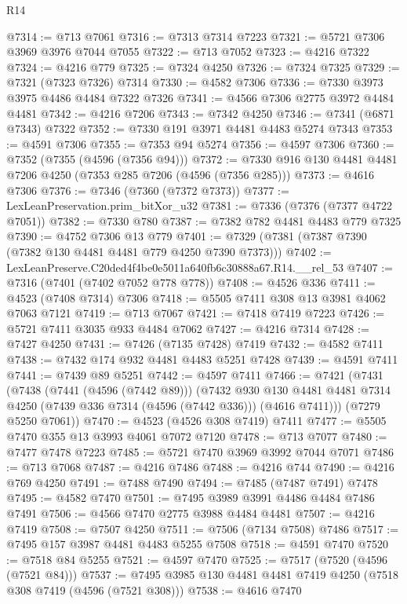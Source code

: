 \begin{lexlean}{R14}
\begin{coremodule}
@7314 := @713 @7061
@7316 := @7313 @7314 @7223
@7321 := @5721 @7306 @3969 @3976 @7044 @7055
@7322 := @713 @7052
@7323 := @4216 @7322
@7324 := @4216 @779
@7325 := @7324 @4250
@7326 := @7324 @7325
@7329 := @7321 (@7323 @7326) @7314
@7330 := @4582 @7306
@7336 := @7330 @3973 @3975 @4486 @4484 @7322 @7326
@7341 := @4566 @7306 @2775 @3972 @4484 @4481
@7342 := @4216 @7206
@7343 := @7342 @4250
@7346 := @7341 (@6871 @7343) @7322
@7352 := @7330 @191 @3971 @4481 @4483 @5274 @7343
@7353 := @4591 @7306
@7355 := @7353 @94 @5274
@7356 := @4597 @7306
@7360 := @7352 (@7355 (@4596 (@7356 @94)))
@7372 := @7330 @916 @130 @4481 @4481 @7206 @4250 (@7353 @285 @7206 (@4596 (@7356 @285)))
@7373 := @4616 @7306
@7376 := @7346 (@7360 (@7372 @7373))
@7377 := LexLeanPreservation.prim_bitXor_u32
@7381 := @7336 (@7376 (@7377 @4722 @7051))
@7382 := @7330 @780
@7387 := @7382 @782 @4481 @4483 @779 @7325
@7390 := @4752 @7306 @13 @779
@7401 := @7329 (@7381 (@7387 @7390 (@7382 @130 @4481 @4481 @779 @4250 @7390 @7373)))
@7402 := LexLeanPreserve.C20ded4f4be0e5011a640fb6c30888a67.R14.__rel_53
@7407 := @7316 (@7401 (@7402 @7052 @778 @778))
@7408 := @4526 @336
@7411 := @4523 (@7408 @7314) @7306
@7418 := @5505 @7411 @308 @13 @3981 @4062 @7063 @7121
@7419 := @713 @7067
@7421 := @7418 @7419 @7223
@7426 := @5721 @7411 @3035 @933 @4484 @7062
@7427 := @4216 @7314
@7428 := @7427 @4250
@7431 := @7426 (@7135 @7428) @7419
@7432 := @4582 @7411
@7438 := @7432 @174 @932 @4481 @4483 @5251 @7428
@7439 := @4591 @7411
@7441 := @7439 @89 @5251
@7442 := @4597 @7411
@7466 := @7421
    (@7431
      (@7438
        (@7441 (@4596 (@7442 @89)))
        (@7432
          @930
          @130
          @4481
          @4481
          @7314
          @4250
          (@7439 @336 @7314 (@4596 (@7442 @336)))
          (@4616 @7411)))
      (@7279 @5250 @7061))
@7470 := @4523 (@4526 @308 @7419) @7411
@7477 := @5505 @7470 @355 @13 @3993 @4061 @7072 @7120
@7478 := @713 @7077
@7480 := @7477 @7478 @7223
@7485 := @5721 @7470 @3969 @3992 @7044 @7071
@7486 := @713 @7068
@7487 := @4216 @7486
@7488 := @4216 @744
@7490 := @4216 @769 @4250
@7491 := @7488 @7490
@7494 := @7485 (@7487 @7491) @7478
@7495 := @4582 @7470
@7501 := @7495 @3989 @3991 @4486 @4484 @7486 @7491
@7506 := @4566 @7470 @2775 @3988 @4484 @4481
@7507 := @4216 @7419
@7508 := @7507 @4250
@7511 := @7506 (@7134 @7508) @7486
@7517 := @7495 @157 @3987 @4481 @4483 @5255 @7508
@7518 := @4591 @7470
@7520 := @7518 @84 @5255
@7521 := @4597 @7470
@7525 := @7517 (@7520 (@4596 (@7521 @84)))
@7537 := @7495 @3985 @130 @4481 @4481 @7419 @4250 (@7518 @308 @7419 (@4596 (@7521 @308)))
@7538 := @4616 @7470

\end{coremodule}
\end{lexlean}
